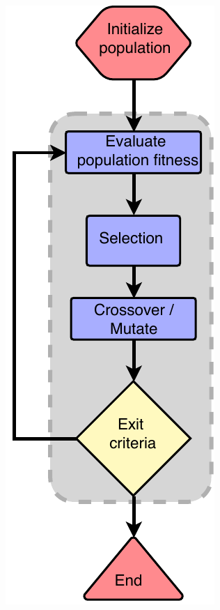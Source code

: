 \begin{figure}[ht]
    \centering
    \begin{subfigure}[ht]{0.25\linewidth}
        \includegraphics[width=\linewidth]{Chapters/2.Background/figures/GA.pdf}

\end{subfigure}
\end{figure}
